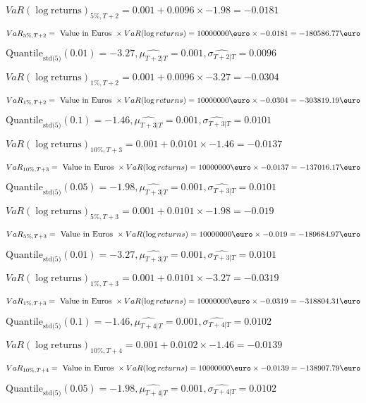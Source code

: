 $VaR(\log \text{returns})_{5\%, T + 2} = 0.001 + 0.0096\times-1.98 = -0.0181$

$VaR_{5\%, T + 2} = \text{ Value in Euros } \times VaR(\log returns) = 10 000 000 \text{\euro} \times-0.0181 = -180586.77 \text{\euro}$


$\text{Quantile}_\text{std(5)}(0.01) = -3.27,\hat{\mu_{T+2|T}} = 0.001, \hat{\sigma_{T+2|T}} = 0.0096$

$VaR(\log \text{returns})_{1\%, T + 2} = 0.001 + 0.0096\times-3.27 = -0.0304$

$VaR_{1\%, T + 2} = \text{ Value in Euros } \times VaR(\log returns) = 10 000 000 \text{\euro} \times-0.0304 = -303819.19 \text{\euro}$


$\text{Quantile}_\text{std(5)}(0.1) = -1.46,\hat{\mu_{T+3|T}} = 0.001, \hat{\sigma_{T+3|T}} = 0.0101$

$VaR(\log \text{returns})_{10\%, T + 3} = 0.001 + 0.0101\times-1.46 = -0.0137$

$VaR_{10\%, T + 3} = \text{ Value in Euros } \times VaR(\log returns) = 10 000 000 \text{\euro} \times-0.0137 = -137016.17 \text{\euro}$


$\text{Quantile}_\text{std(5)}(0.05) = -1.98,\hat{\mu_{T+3|T}} = 0.001, \hat{\sigma_{T+3|T}} = 0.0101$

$VaR(\log \text{returns})_{5\%, T + 3} = 0.001 + 0.0101\times-1.98 = -0.019$

$VaR_{5\%, T + 3} = \text{ Value in Euros } \times VaR(\log returns) = 10 000 000 \text{\euro} \times-0.019 = -189684.97 \text{\euro}$


$\text{Quantile}_\text{std(5)}(0.01) = -3.27,\hat{\mu_{T+3|T}} = 0.001, \hat{\sigma_{T+3|T}} = 0.0101$

$VaR(\log \text{returns})_{1\%, T + 3} = 0.001 + 0.0101\times-3.27 = -0.0319$

$VaR_{1\%, T + 3} = \text{ Value in Euros } \times VaR(\log returns) = 10 000 000 \text{\euro} \times-0.0319 = -318804.31 \text{\euro}$


$\text{Quantile}_\text{std(5)}(0.1) = -1.46,\hat{\mu_{T+4|T}} = 0.001, \hat{\sigma_{T+4|T}} = 0.0102$

$VaR(\log \text{returns})_{10\%, T + 4} = 0.001 + 0.0102\times-1.46 = -0.0139$

$VaR_{10\%, T + 4} = \text{ Value in Euros } \times VaR(\log returns) = 10 000 000 \text{\euro} \times-0.0139 = -138907.79 \text{\euro}$


$\text{Quantile}_\text{std(5)}(0.05) = -1.98,\hat{\mu_{T+4|T}} = 0.001, \hat{\sigma_{T+4|T}} = 0.0102$

